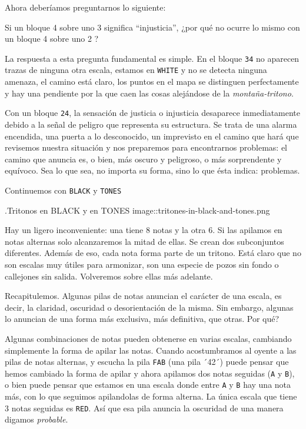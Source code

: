 \documentclass[]{article}
\begin{document}
  Ahora deberíamos preguntarnos lo siguiente:
  
  Si un bloque 4 sobre uno 3 significa ``injusticia'', ¿por qué no ocurre lo mismo con un bloque 4 sobre uno 2 ?
  
  La respuesta a esta pregunta fundamental es simple. En el bloque \texttt{34} no aparecen trazas de ninguna otra escala, estamos en \texttt{WHITE} y no se detecta ninguna amenaza, el camino está claro, los puntos en el mapa se distinguen perfectamente y hay una pendiente por la que caen las cosas alejándose de la \emph{montaña-tritono}.
  
  Con un bloque \texttt{24}, la sensación de justicia o injusticia desaparece inmediatamente debido a la señal de peligro que representa su estructura. Se trata de una alarma encendida, una puerta a lo desconocido, un imprevisto en el camino que hará que revisemos nuestra situación y nos preparemos para encontrarnos problemas: el camino que anuncia es, o bien, más oscuro y peligroso, o más sorprendente y equívoco. Sea lo que sea, no importa su forma, sino lo que ésta indica: problemas.
  
  Continuemos con \texttt{BLACK} y \texttt{TONES}
  
  .Tritonos en BLACK y en TONES image::tritones-in-black-and-tones.png
  
  Hay un ligero inconveniente: una tiene 8 notas y la otra 6. Si las apilamos en notas alternas solo alcanzaremos la mitad de ellas. Se crean dos subconjuntos diferentes. Además de eso, cada nota forma parte de un tritono. Está claro que no son escalas muy útiles para armonizar, son una especie de pozos sin fondo o callejones sin salida. Volveremos sobre ellas más adelante.
  
  Recapitulemos. Algunas pilas de notas anuncian el carácter de una escala, es decir, la claridad, oscuridad o desorientación de la misma. Sin embargo, algunas lo anuncian de una forma más exclusiva, más definitiva, que otras. Por qué?
  
  Algunas combinaciones de notas pueden obtenerse en varias escalas, cambiando simplemente la forma de apilar las notas. Cuando acostumbramos al oyente a las pilas de notas alternas, y escucha la pila \texttt{FAB} (una pila ´42´) puede pensar que hemos cambiado la forma de apilar y ahora apilamos dos notas seguidas (\texttt{A} y \texttt{B}), o bien puede pensar que estamos en una escala donde entre \texttt{A} y \texttt{B} hay una nota más, con lo que seguimos apilandolas de forma alterna. La única escala que tiene 3 notas seguidas es \texttt{RED}. Así que esa pila anuncia la oscuridad de una manera digamos \emph{probable}.
  
\end{document}
